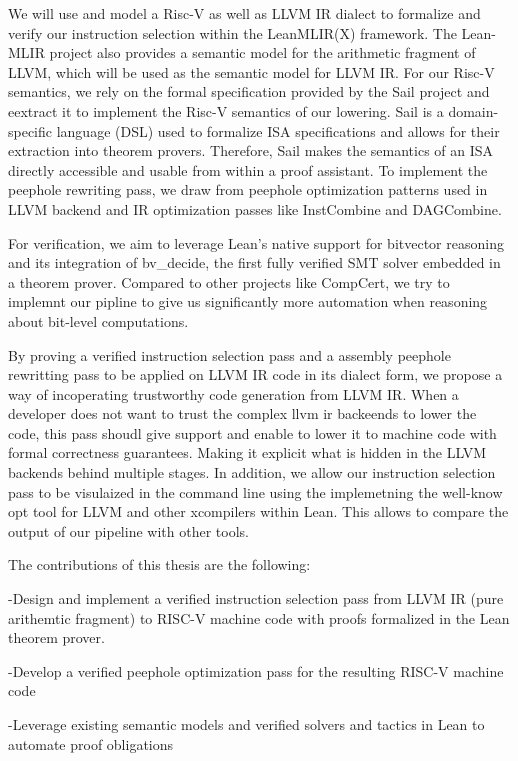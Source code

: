 We will use and model a Risc-V as well as LLVM IR dialect to formalize and verify our instruction selection within the LeanMLIR(X) framework. The Lean-MLIR project also provides a semantic model for the arithmetic fragment of LLVM,  which will be used as the semantic model for LLVM IR.  For our Risc-V semantics, we rely on the formal specification provided by the Sail project and eextract it to implement the Risc-V semantics of our lowering. Sail is a domain-specific language (DSL) used to formalize ISA specifications and allows for their extraction into theorem provers. Therefore, Sail makes the semantics of an ISA directly accessible and usable from within a proof assistant. To implement the peephole rewriting pass, we draw from peephole optimization patterns used in LLVM backend and IR optimization passes like InstCombine and DAGCombine.

For verification, we aim to leverage Lean’s native support for bitvector reasoning and its integration of bv\_decide, the first fully verified SMT solver embedded in a theorem prover. Compared to other projects like CompCert, we try to implemnt our pipline to give us significantly more automation when reasoning about bit-level computations. 

By proving a verified instruction selection pass and a assembly peephole rewritting pass to be applied on LLVM IR code in its dialect form, we propose a way of incoperating trustworthy code generation from LLVM IR. When a developer does not want to trust the complex llvm ir backeends to lower the code, this pass shoudl give support and enable to lower it to machine code with formal correctness guarantees. Making it explicit what is hidden in the LLVM backends behind multiple stages. In addition, we allow our instruction selection pass to be visulaized in the command line using the implemetning the  well-know opt tool for LLVM and other xcompilers within Lean. This allows to compare the output of our pipeline with other tools. 




The contributions of this thesis are the following:

-Design and implement a verified instruction selection pass from LLVM IR (pure arithemtic fragment) to RISC-V machine code with proofs formalized in the Lean theorem prover.

-Develop a verified peephole optimization pass for the resulting RISC-V machine code

-Leverage existing semantic models and verified solvers and tactics in Lean to automate proof obligations


